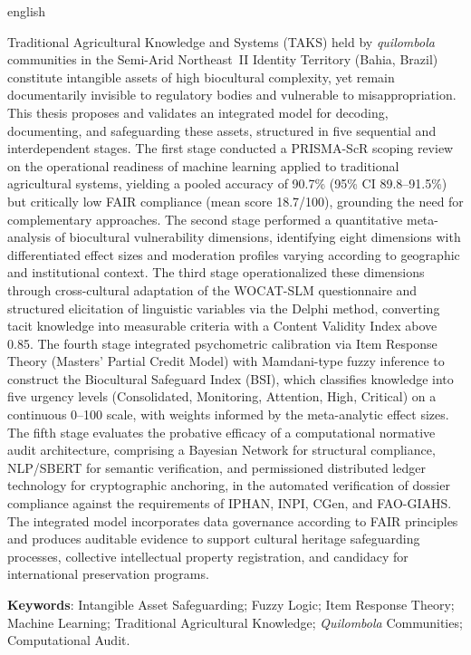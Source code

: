 \setlength{\absparsep}{18pt} %
\begin{resumo}[Abstract]

\begin{otherlanguage*}{english}

Traditional Agricultural Knowledge and Systems (TAKS) held by \textit{quilombola} communities in the Semi-Arid Northeast~II Identity Territory (Bahia, Brazil) constitute intangible assets of high biocultural complexity, yet remain documentarily invisible to regulatory bodies and vulnerable to misappropriation. This thesis proposes and validates an integrated model for decoding, documenting, and safeguarding these assets, structured in five sequential and interdependent stages. The first stage conducted a PRISMA-ScR scoping review on the operational readiness of machine learning applied to traditional agricultural systems, yielding a pooled accuracy of 90.7\% (95\% CI 89.8--91.5\%) but critically low FAIR compliance (mean score 18.7/100), grounding the need for complementary approaches. The second stage performed a quantitative meta-analysis of biocultural vulnerability dimensions, identifying eight dimensions with differentiated effect sizes and moderation profiles varying according to geographic and institutional context. The third stage operationalized these dimensions through cross-cultural adaptation of the WOCAT-SLM questionnaire and structured elicitation of linguistic variables via the Delphi method, converting tacit knowledge into measurable criteria with a Content Validity Index above 0.85. The fourth stage integrated psychometric calibration via Item Response Theory (Masters' Partial Credit Model) with Mamdani-type fuzzy inference to construct the Biocultural Safeguard Index (BSI), which classifies knowledge into five urgency levels (Consolidated, Monitoring, Attention, High, Critical) on a continuous 0--100 scale, with weights informed by the meta-analytic effect sizes. The fifth stage evaluates the probative efficacy of a computational normative audit architecture, comprising a Bayesian Network for structural compliance, NLP/SBERT for semantic verification, and permissioned distributed ledger technology for cryptographic anchoring, in the automated verification of dossier compliance against the requirements of IPHAN, INPI, CGen, and FAO-GIAHS. The integrated model incorporates data governance according to FAIR principles and produces auditable evidence to support cultural heritage safeguarding processes, collective intellectual property registration, and candidacy for international preservation programs.

\textbf{Keywords}: Intangible Asset Safeguarding; Fuzzy Logic; Item Response Theory; Machine Learning; Traditional Agricultural Knowledge; \textit{Quilombola} Communities; Computational Audit.
 \end{otherlanguage*}
\end{resumo}

